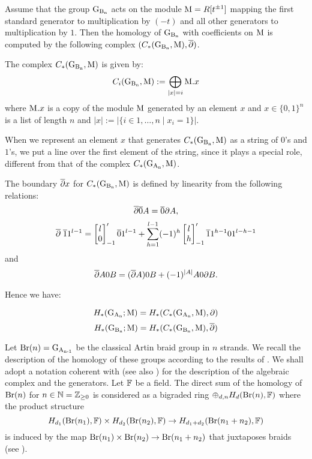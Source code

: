 Assume that the group $\operatorname{G_{B_{n}}}$ acts on the module $\mathrm{M} = R[t^{\pm 1}]$ mapping the first standard generator to multiplication by $(-t)$ and all other generators to multiplication by $1$. Then the homology of $\operatorname{G_{B_{n}}}$ with coefficients on $\mathrm{M}$ is computed by the following complex $(C_*(\operatorname{G_{B_{n}}}, \mathrm{M}),\overline{\partial}) $.
\begin{df}\label{def:complesso}
The complex $C_*(\operatorname{G_{B_{n}}}, \mathrm{M})$ is given by:
$$
C_i(\operatorname{G_{B_{n}}}, \mathrm{M}) := \bigoplus_{|x| = i} \mathrm{M}.x 
$$
where $\mathrm{M}.x$ is a copy of the module $\mathrm{M}$ generated by an element $x$ and $x \in \{0,1\}^n$ is a list of length $n$ and $|x| :=  |\{i \in 1, \ldots, n \mid x_i = 1\}|$.

When we represent an element $x$ that generates $C_*(\operatorname{G_{B_{n}}}, \mathrm{M})$ as a string of $0$'s and $1$'s, we put a line over the first element of the string, since it plays a special role, different from that of the complex $C_*(\operatorname{G_{A_{n}}}, \mathrm{M})$.

The boundary $\overline{\partial} x$ for $C_*(\operatorname{G_{B_{n}}}, \mathrm{M})$ is defined by linearity from the following relations:
$$
\overline{\partial} \overline{0}A = \overline{0}\partial A,
$$
$$
\DB \; \overline{1}1^{l-1} = 
\qbin{l}{0}_{-1}' \overline{0}1^{l-1} + \sum_{h=1}^{l-1} (-1)^{h}\qbin{l}{h}_{-1}' 
\overline{1}1^{h-1}01^{l-h-1}
$$
and
$$
\overline{\partial} A0B = (\overline{\partial} A)0B + (-1)^{|A|}A0\partial B.
$$
\end{df}

Hence we have:
\begin{thm}
$$
H_*(\operatorname{G_{A_{n}}}; \mathrm{M}) = H_*(C_*(\operatorname{G_{A_{n}}}, \mathrm{M}), \partial)
$$
$$
H_*(\operatorname{G_{B_{n}}}; \mathrm{M}) = H_*(C_*(\operatorname{G_{B_{n}}}, \mathrm{M}), \overline{\partial})
$$
\end{thm}


Let $\operatorname{Br}(n) = \operatorname{G_{A_{n-1}}}$ be the classical Artin braid group in $n$ strands. We recall the description of the homology of these groups
according to the results of \cite{cohen, fuks, vain}. 
We shall adopt a notation coherent with \cite{dps} (see also \cite{cal06}) for the description of 
the algebraic complex and the generators. Let $\mathbb{F}$ be a field.
The direct sum of the homology of $\operatorname{Br}(n)$ for $n \in {\mathbb{N}} = \mathbb{Z}_{\geq 0}$ is considered as a bigraded ring $\oplus_{d,n} H_d(\operatorname{Br}(n), \mathbb{F})$ 
where the product structure $$H_{d_1}(\operatorname{Br}(n_1), \mathbb{F}) \times H_{d_2}(\operatorname{Br}(n_2), \mathbb{F}) \to H_{d_1+d_2}(\operatorname{Br}(n_1+n_2), \mathbb{F})$$
is induced by the map $\operatorname{Br}(n_1) \times \operatorname{Br}(n_2) \to \operatorname{Br}(n_1 + n_2)$ that juxtaposes braids (see \cite{cohen_braids, cal06}). 


